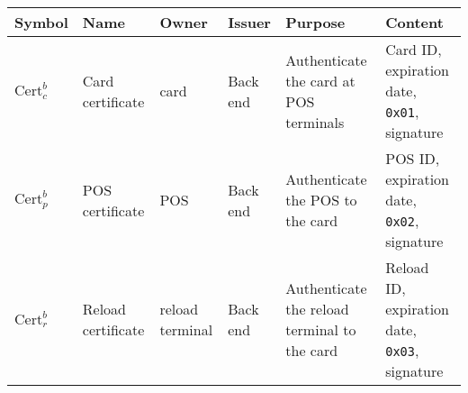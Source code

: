 \begin{tabular}{|l|p{1.7cm}|p{1.5cm}|p{1.5cm}|p{4cm}|p{3cm}|}
\hline
    Symbol & Name & Owner & Issuer & Purpose & Content \\
\hline
    $\textrm{Cert}_c^b$ & Card \mbox{certificate} & card & Back end & Authenticate the card at POS terminals & Card ID, expiration date, \texttt{0x01}, signature \\
\hline
    $\textrm{Cert}_p^b$ & POS \mbox{certificate} & POS & Back end & Authenticate the POS to the card & POS ID, expiration date, \texttt{0x02}, signature \\
\hline
    $\textrm{Cert}_r^b$ & Reload \mbox{certificate} & reload terminal & Back end & Authenticate the reload terminal to the card & Reload ID, expiration date, \texttt{0x03}, signature \\
\hline
\end{tabular}